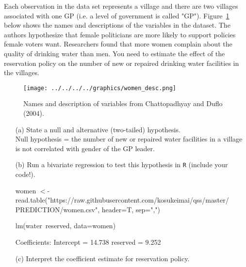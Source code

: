\documentclass[12pt,letterpaper]{article}
\begin{document}
\noindent Each observation in the data set represents a village and there are two villages associated with one GP (i.e. a level of government is called "GP"). Figure~\ref{fig:women_desc} below shows the names and descriptions of the variables in the dataset. The authors hypothesize that female politicians are more likely to support policies female voters want. Researchers found that more women complain about the quality of drinking water than men. You need to estimate the effect of the reservation policy on the number of new or repaired drinking water facilities in the villages.
\vspace{.5cm}
\begin{figure}[h!]
	\caption{\footnotesize{Names and description of variables from Chattopadhyay and Duflo (2004).}}
	\vspace{.5cm}
	\centering
	\label{fig:women_desc}
	\texttt{[image: ../../../../graphics/women\_desc.png]}
\end{figure}		

\newpage
\begin{enumerate}
	\item [(a)] State a null and alternative (two-tailed) hypothesis. 
	\\ Null hypothesis = the number of new or repaired water facilities in a village is not correlated with gender of the GP leader. 
	
	\item [(b)] Run a bivariate regression to test this hypothesis in \texttt{R} (include your code!).
	
	women $<$- read.table("https://raw.githubusercontent.com/kosukeimai/qss/master/
	PREDICTION/women.csv", header=T, sep=",")

    lm(water~reserved, data=women)
    
    Coefficients:
    Intercept = 14.738
    reserved = 9.252
	
	\item [(c)] Interpret the coefficient estimate for reservation policy. 

    

\end{enumerate}
\end{document}
